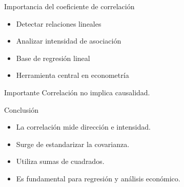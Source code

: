 \documentclass{beamer}
\begin{document}
\begin{frame}{Importancia del coeficiente de correlación}

\begin{itemize}
\item Detectar relaciones lineales
\item Analizar intensidad de asociación
\item Base de regresión lineal
\item Herramienta central en econometría
\end{itemize}

\vspace{0.4cm}

\begin{block}{Importante}
Correlación no implica causalidad.
\end{block}

\end{frame}

\begin{frame}{Conclusión}

\begin{itemize}
\item La correlación mide dirección e intensidad.
\item Surge de estandarizar la covarianza.
\item Utiliza sumas de cuadrados.
\item Es fundamental para regresión y análisis económico.
\end{itemize}

\end{frame}
\end{document}
